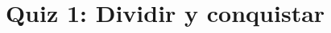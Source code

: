 \documentclass{doc}
\title{Quiz 1: Dividir y conquistar}
\begin{document}
\makedocheader
\quizidentification

\quizback
\end{document}
